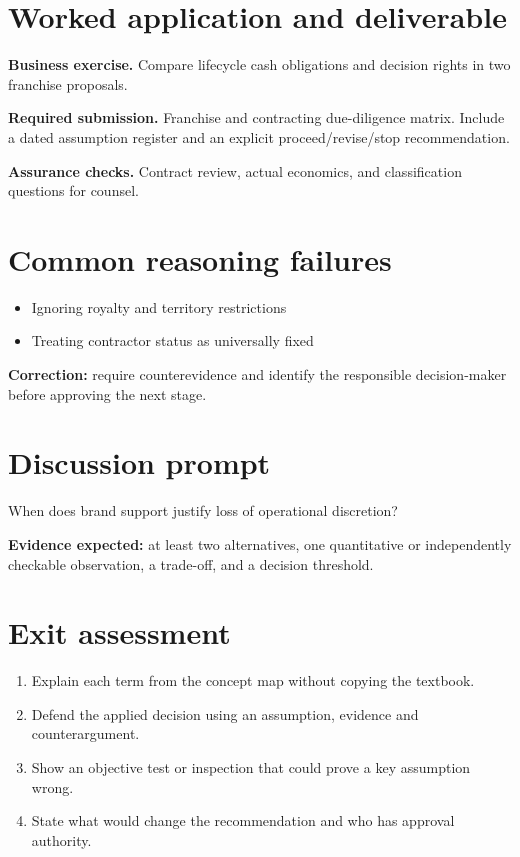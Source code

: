 \documentclass[11pt,letterpaper]{article}
\begin{document}
\section{Worked application and deliverable}
\textbf{Business exercise.} Compare lifecycle cash obligations and decision rights in two franchise proposals.\par\textbf{Required submission.} Franchise and contracting due-diligence matrix. Include a dated assumption register and an explicit proceed/revise/stop recommendation.\par\textbf{Assurance checks.} Contract review, actual economics, and classification questions for counsel.
\section{Common reasoning failures}
\begin{itemize}[leftmargin=*,itemsep=3pt]
\item Ignoring royalty and territory restrictions
\item Treating contractor status as universally fixed
\end{itemize}
\noindent\textbf{Correction:} require counterevidence and identify the responsible decision-maker before approving the next stage.
\section{Discussion prompt}
When does brand support justify loss of operational discretion?\par\medskip\textbf{Evidence expected:} at least two alternatives, one quantitative or independently checkable observation, a trade-off, and a decision threshold.
\section{Exit assessment}
\begin{enumerate}[leftmargin=*,itemsep=5pt]
\item Explain each term from the concept map without copying the textbook.
\item Defend the applied decision using an assumption, evidence and counterargument.
\item Show an objective test or inspection that could prove a key assumption wrong.
\item State what would change the recommendation and who has approval authority.
\end{enumerate}

\end{document}
